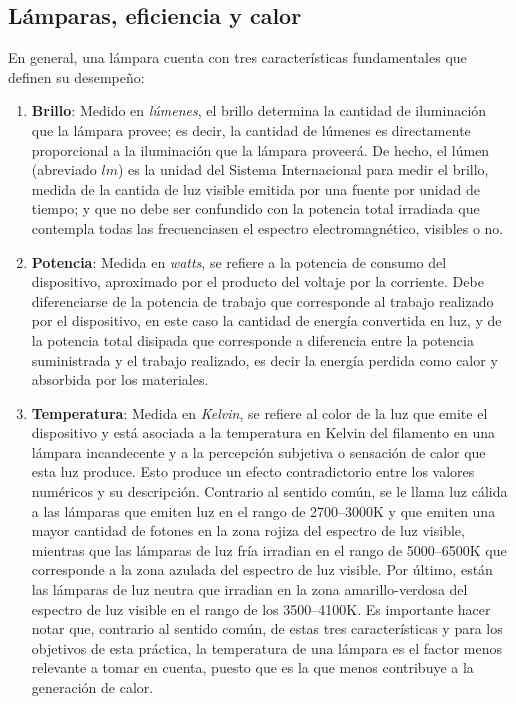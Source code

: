%
%


\subsection{Lámparas, eficiencia y calor}%
\label{intro-lamps}
En general, una lámpara cuenta con tres características fundamentales que definen su desempeño:
\begin{enumerate}[nosep,label=\roman*\rpar]
	\item \textbf{Brillo}: Medido en \emph{lúmenes}, el brillo determina la cantidad de iluminación que la lámpara provee; es decir, la cantidad de lúmenes es directamente proporcional a la iluminación que la lámpara proveerá.
	De hecho, el lúmen (abreviado $lm$) es la unidad del Sistema Internacional para medir el brillo, medida de la cantida de luz visible emitida por una fuente por unidad de tiempo; y que no debe ser confundido con la potencia total irradiada que contempla todas las frecuenciasen el espectro electromagnético, visibles o no.

	\item \textbf{Potencia}: Medida en \emph{watts}, se refiere a la potencia de consumo del dispositivo, aproximado por el producto del voltaje por la corriente.
	Debe diferenciarse de la potencia de trabajo que corresponde al trabajo realizado por el dispositivo, en este caso la cantidad de energía convertida en luz, y de la potencia total disipada que corresponde a diferencia entre la potencia suministrada y el trabajo realizado, es decir la energía perdida como calor y absorbida por los materiales.

	\item \textbf{Temperatura}: Medida en \emph{Kelvin}, se refiere al color de la luz que emite el dispositivo y está asociada a la temperatura en Kelvin del filamento en una lámpara incandecente y a la percepción subjetiva o sensación de calor que esta luz produce.
	Esto produce un efecto contradictorio entre los valores numéricos y su descripción.
	Contrario al sentido común, se le llama luz cálida a las lámparas que emiten luz en el rango de 2700--3000K y que emiten una mayor cantidad de fotones en la zona rojiza del espectro de luz visible,
	mientras que las lámparas de luz fría irradian en el rango de 5000--6500K que corresponde a la zona azulada del espectro de luz visible.
	Por último, están las lámparas de luz neutra que irradian en la zona amarillo-verdosa del espectro de luz visible en el rango de los 3500--4100K.
	Es importante hacer notar que, contrario al sentido común, de estas tres características y para los objetivos de esta práctica, la temperatura de una lámpara es el factor menos relevante a tomar en cuenta, puesto que es la que menos contribuye a la generación de calor.
\end{enumerate}

